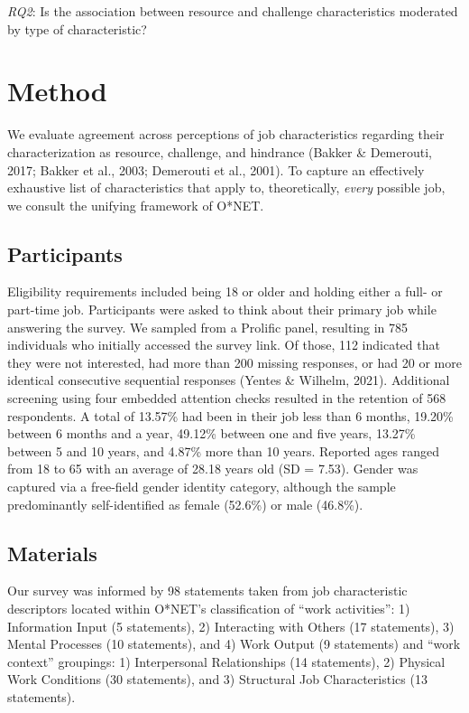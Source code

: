 \documentclass[
  man]{apa6}
\begin{document}
\emph{RQ2}: Is the association between resource and challenge characteristics moderated by type of characteristic?

\hypertarget{method}{%
\section{Method}\label{method}}

We evaluate agreement across perceptions of job characteristics regarding their characterization as resource, challenge, and hindrance (Bakker \& Demerouti, 2017; Bakker et al., 2003; Demerouti et al., 2001). To capture an effectively exhaustive list of characteristics that apply to, theoretically, \emph{every} possible job, we consult the unifying framework of O*NET.

\hypertarget{participants}{%
\subsection{Participants}\label{participants}}

Eligibility requirements included being 18 or older and holding either a full- or part-time job. Participants were asked to think about their primary job while answering the survey. We sampled from a Prolific panel, resulting in 785 individuals who initially accessed the survey link. Of those, 112 indicated that they were not interested, had more than 200 missing responses, or had 20 or more identical consecutive sequential responses (Yentes \& Wilhelm, 2021). Additional screening using four embedded attention checks resulted in the retention of 568 respondents. A total of 13.57\% had been in their job less than 6 months, 19.20\% between 6 months and a year, 49.12\% between one and five years, 13.27\% between 5 and 10 years, and 4.87\% more than 10 years. Reported ages ranged from 18 to 65 with an average of 28.18 years old (SD = 7.53). Gender was captured via a free-field gender identity category, although the sample predominantly self-identified as female (52.6\%) or male (46.8\%).

\hypertarget{materials}{%
\subsection{Materials}\label{materials}}

Our survey was informed by 98 statements taken from job characteristic descriptors located within O*NET's classification of ``work activities'': 1) Information Input (5 statements), 2) Interacting with Others (17 statements), 3) Mental Processes (10 statements), and 4) Work Output (9 statements) and ``work context'' groupings: 1) Interpersonal Relationships (14 statements), 2) Physical Work Conditions (30 statements), and 3) Structural Job Characteristics (13 statements).
\end{document}
